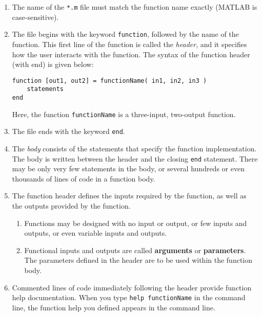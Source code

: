\begin{enumerate}
\item The name of the \texttt{*.m} file must match the function name exactly (MATLAB is case-sensitive).
\item The file begins with the keyword \texttt{function}, followed by the name of the function. This first line of the function is called the \textit{header}, and it specifies how the user interacts with the function. The syntax of the function header (with end) is given below:
\begin{lstlisting}[style=Matlab-editor]
function [out1, out2] = functionName( in1, in2, in3 )
	statements
end
\end{lstlisting}
Here, the function \texttt{functionName} is a three-input, two-output function.
\item The file ends with the keyword \texttt{end}.
\item The \textit{body} consists of the statements that specify the function implementation. The body is written between the header and the closing \texttt{end} statement. There may be only very few statements in the body, or several hundreds or even thousands of lines of code in a function body.
\item The function header defines the inputs required by the function, as well as the outputs provided by the function.
\begin{enumerate}
\item Functions may be designed with no input or output, or few inputs and outputs, or even variable inputs and outputs.
\item Functional inputs and outputs are called \textbf{arguments} or \textbf{parameters}. The parameters defined in the header are to be used within the function body.
\end{enumerate}
\item Commented lines of code immediately following the header provide function help documentation. When you type \texttt{help functionName} in the command line, the function help you defined appears in the command line.
\end{enumerate}
